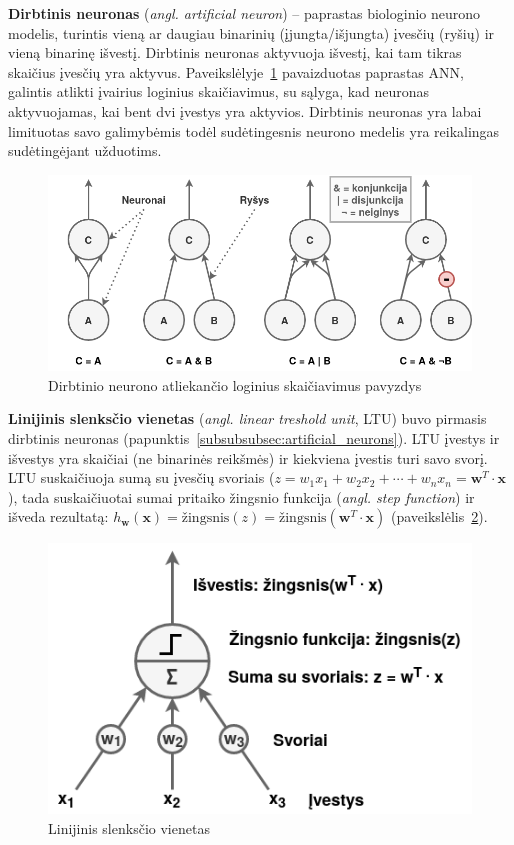 \documentclass{VUMIFPSbakalaurinis}
\begin{document}
\label{subsubsubsec:artificial_neurons}
{
	\textbf{Dirbtinis neuronas} (\textit{angl. artificial neuron}) -- paprastas biologinio neurono modelis, turintis vieną ar daugiau binarinių (įjungta/išjungta) įvesčių (ryšių) ir vieną binarinę išvestį. Dirbtinis neuronas aktyvuoja išvestį, kai tam tikras skaičius įvesčių yra aktyvus. Paveikslėlyje~\ref{img:artificial_neurons} pavaizduotas paprastas ANN, galintis atlikti įvairius loginius skaičiavimus, su sąlyga, kad neuronas aktyvuojamas, kai bent dvi įvestys yra aktyvios. Dirbtinis neuronas yra labai limituotas savo galimybėmis todėl sudėtingesnis neurono medelis yra reikalingas sudėtingėjant užduotims. 
	
	\begin{figure}[H]
		\centering
		\includegraphics[scale=0.33]{img/artificial_neurons}
		\caption{Dirbtinio neurono atliekančio loginius skaičiavimus pavyzdys}
		\label{img:artificial_neurons}
	\end{figure} 
}
\label{subsubsubsec:ltu}
{
	\textbf{Linijinis slenksčio vienetas} (\textit{angl. linear treshold unit}, LTU) buvo pirmasis dirbtinis neuronas (papunktis~\ref{subsubsubsec:artificial_neurons}). LTU įvestys ir išvestys yra skaičiai (ne binarinės reikšmės) ir kiekviena įvestis turi savo svorį. LTU suskaičiuoja sumą su įvesčių svoriais (\(z = w_1 x_1 + w_2 x_2 + \cdots + w_n x_n = \mathbf{w}^T \cdot \mathbf{x} \)), tada suskaičiuotai sumai pritaiko žingsnio funkcija (\textit{angl. step function}) ir išveda rezultatą: \(h_\mathbf{w}(\mathbf{x}) = \textrm{žingsnis}(z) = \textrm{žingsnis}(\mathbf{w}^T \cdot \mathbf{x})\) (paveikslėlis~\ref{img:ltu}).
	
	\begin{figure}[H]
		\centering
		\includegraphics[scale=0.33]{img/ltu}
		\caption{Linijinis slenksčio vienetas}
		\label{img:ltu}
	\end{figure} 
}
\end{document}
